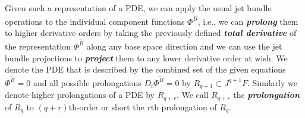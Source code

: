 Given such a representation of a PDE, we can apply the usual jet bundle operations to the individual component functions $\Phi^{\tilde{B}}$, i.e., we can \textit{\textbf{prolong}} them to higher derivative orders by taking the previously defined \textit{\textbf{total derivative}} of the representation $\Phi^{\tilde{B}}$ along any base space direction and we can use the jet bundle projections to \textit{\textbf{project}} them to any lower derivative order at wish. We denote the PDE that is described by the combined set of the given equations $\Phi^{\tilde{B}}=0$ and all possible prolongations $D_i\Phi^{\tilde{B}}=0$ by $R_{q+1} \subset J^{q+1}F$. Similarly we denote higher prolongations of a PDE by $R_{q+r}$. We call $R_{q+r}$ the \textit{\textbf{prolongation}} of $R_q$ to $(q+r)$th-order or short the $r$th prolongation of $R_q$. 

